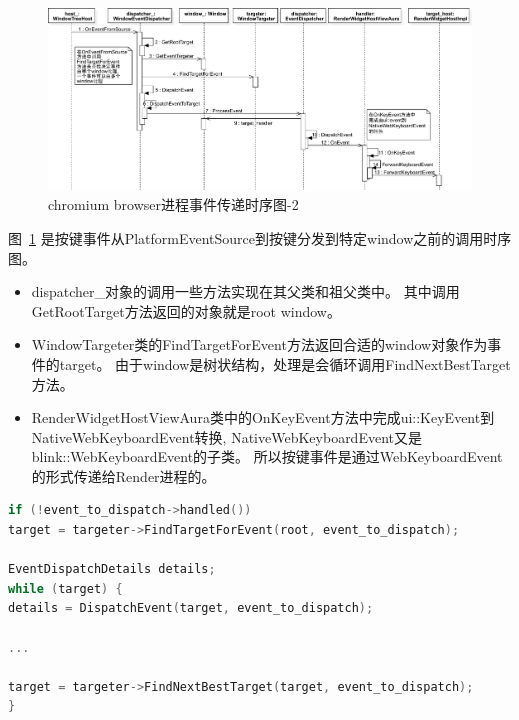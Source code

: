 \begin{figure}[H] 
  \centering 
  \includegraphics[width=\textwidth]{image/event_study/browser_event_dispatch_sequence_2.pdf} 
  \caption{chromium browser进程事件传递时序图-2} \label{fig:browser_event_dispatch_sequence_2} 
\end{figure}

图~\ref{fig:browser_event_dispatch_sequence_2}
是按键事件从PlatformEventSource到按键分发到特定window之前的调用时序图。

\begin{itemize}
  \item dispatcher\_对象的调用一些方法实现在其父类和祖父类中。
  其中调用GetRootTarget方法返回的对象就是root window。
  \item WindowTargeter类的FindTargetForEvent方法返回合适的window对象作为事件的target。
  由于window是树状结构，处理是会循环调用FindNextBestTarget方法。
  \item RenderWidgetHostViewAura类中的OnKeyEvent方法中完成ui::KeyEvent到NativeWebKeyboardEvent转换,
  NativeWebKeyboardEvent又是blink::WebKeyboardEvent的子类。
  所以按键事件是通过WebKeyboardEvent的形式传递给Render进程的。
\end{itemize}

\begin{spacing}{1.0}
\begin{lstlisting}[language={C++}]
if (!event_to_dispatch->handled())
target = targeter->FindTargetForEvent(root, event_to_dispatch);

EventDispatchDetails details;
while (target) {
details = DispatchEvent(target, event_to_dispatch);

...
  
target = targeter->FindNextBestTarget(target, event_to_dispatch);
}
\end{lstlisting}
\end{spacing}


